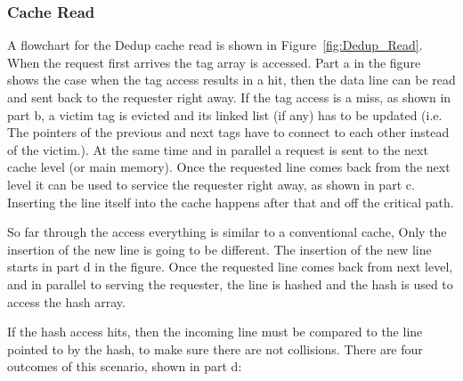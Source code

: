 \subsubsection{Cache Read}
A flowchart for the Dedup cache read is shown in Figure~\ref{fig:Dedup_Read}. When the request first arrives the tag array is accessed. Part a in the figure shows the case when the tag access results in a hit, then the data line can be read and sent back to the requester right away. If the tag access is a miss, as shown in part b, a victim tag is evicted and its linked list (if any) has to be updated (i.e. The pointers of the previous and next tags have to connect to each other instead of the victim.). At the same time and in parallel a request is sent to the next cache level (or main memory). Once the requested line comes back from the next level it can be used to service the requester right away, as shown in part c. Inserting the line itself into the cache happens after that and off the critical path.\par
So far through the access everything is similar to a conventional cache, Only the insertion of the new line is going to be different. The insertion of the new line starts in part d in the figure. Once the requested line comes back from next level, and in parallel to serving the requester, the line is hashed and the hash is used to access the hash array.\par
If the hash access hits, then the incoming line must be compared to the line pointed to by the hash, to make sure there are not collisions. There are four outcomes of this scenario, shown in part d:
